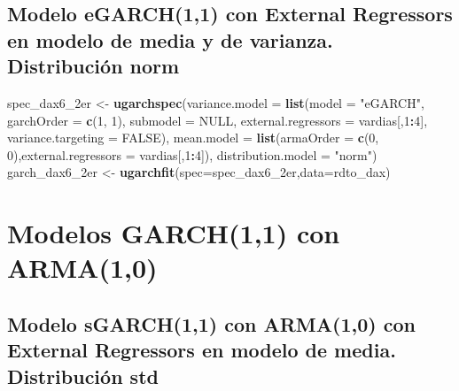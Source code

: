 \documentclass[
  11pt,
]{article}
\newenvironment{Shaded}{\begin{snugshade}}{\end{snugshade}}
\newcommand{\DataTypeTok}[1]{\textcolor[rgb]{0.13,0.29,0.53}{#1}}
\newcommand{\DecValTok}[1]{\textcolor[rgb]{0.00,0.00,0.81}{#1}}
\newcommand{\KeywordTok}[1]{\textcolor[rgb]{0.13,0.29,0.53}{\textbf{#1}}}
\newcommand{\NormalTok}[1]{#1}
\newcommand{\OperatorTok}[1]{\textcolor[rgb]{0.81,0.36,0.00}{\textbf{#1}}}
\newcommand{\OtherTok}[1]{\textcolor[rgb]{0.56,0.35,0.01}{#1}}
\newcommand{\StringTok}[1]{\textcolor[rgb]{0.31,0.60,0.02}{#1}}
\begin{document}
\hypertarget{modelo-egarch11-con-external-regressors-en-modelo-de-media-y-de-varianza.-distribuciuxf3n-norm}{%
\subsection{Modelo eGARCH(1,1) con External Regressors en modelo de
media y de varianza. Distribución
norm}\label{modelo-egarch11-con-external-regressors-en-modelo-de-media-y-de-varianza.-distribuciuxf3n-norm}}

\begin{Shaded}
\begin{Highlighting}[]
\NormalTok{spec_dax6_2er <-}\StringTok{ }\KeywordTok{ugarchspec}\NormalTok{(}\DataTypeTok{variance.model =} \KeywordTok{list}\NormalTok{(}\DataTypeTok{model =} \StringTok{"eGARCH"}\NormalTok{, }\DataTypeTok{garchOrder =} \KeywordTok{c}\NormalTok{(}\DecValTok{1}\NormalTok{, }\DecValTok{1}\NormalTok{), }
                    \DataTypeTok{submodel =} \OtherTok{NULL}\NormalTok{, }\DataTypeTok{external.regressors =}\NormalTok{ vardias[,}\DecValTok{1}\OperatorTok{:}\DecValTok{4}\NormalTok{], }\DataTypeTok{variance.targeting =} \OtherTok{FALSE}\NormalTok{), }
                    \DataTypeTok{mean.model =} \KeywordTok{list}\NormalTok{(}\DataTypeTok{armaOrder =} \KeywordTok{c}\NormalTok{(}\DecValTok{0}\NormalTok{, }\DecValTok{0}\NormalTok{),}\DataTypeTok{external.regressors =}\NormalTok{ vardias[,}\DecValTok{1}\OperatorTok{:}\DecValTok{4}\NormalTok{]),}
               \DataTypeTok{distribution.model =} \StringTok{"norm"}\NormalTok{)}
\NormalTok{garch_dax6_2er <-}\StringTok{ }\KeywordTok{ugarchfit}\NormalTok{(}\DataTypeTok{spec=}\NormalTok{spec_dax6_2er,}\DataTypeTok{data=}\NormalTok{rdto_dax)}
\end{Highlighting}
\end{Shaded}

\hypertarget{modelos-garch11-con-arma10}{%
\section{Modelos GARCH(1,1) con
ARMA(1,0)}\label{modelos-garch11-con-arma10}}

\hypertarget{modelo-sgarch11-con-arma10-con-external-regressors-en-modelo-de-media.-distribuciuxf3n-std}{%
\subsection{Modelo sGARCH(1,1) con ARMA(1,0) con External Regressors en
modelo de media. Distribución
std}\label{modelo-sgarch11-con-arma10-con-external-regressors-en-modelo-de-media.-distribuciuxf3n-std}}
\end{document}
